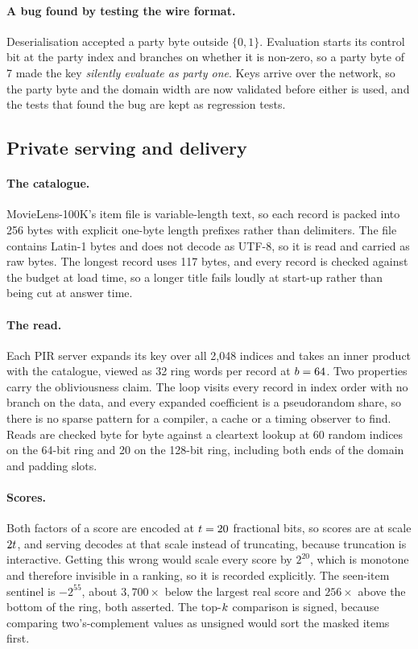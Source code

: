 \paragraph{A bug found by testing the wire format.} Deserialisation accepted a
party byte outside $\{0, 1\}$. Evaluation starts its control bit at the party
index and branches on whether it is non-zero, so a party byte of 7 made the key
\emph{silently evaluate as party one}. Keys arrive over the network, so the party
byte and the domain width are now validated before either is used, and the tests
that found the bug are kept as regression tests.

\subsection{Private serving and delivery}
\label{sec:impl:serve}

\paragraph{The catalogue.} MovieLens-100K's item file is variable-length text, so
each record is packed into 256 bytes with explicit one-byte length prefixes
rather than delimiters. The file contains Latin-1 bytes and does not decode as
UTF-8, so it is read and carried as raw bytes. The longest record uses 117 bytes,
and every record is checked against the budget at load time, so a longer title
fails loudly at start-up rather than being cut at answer time.

\paragraph{The read.} Each PIR server expands its key over all 2{,}048 indices
and takes an inner product with the catalogue, viewed as 32 ring words per
record at $b = 64$. Two properties carry the obliviousness claim. The loop
visits every record in index order with no branch on the data, and every expanded
coefficient is a pseudorandom share, so there is no sparse pattern for a
compiler, a cache or a timing observer to find. Reads are checked byte for byte
against a cleartext lookup at 60 random indices on the 64-bit ring and 20 on the
128-bit ring, including both ends of the domain and padding slots.

\paragraph{Scores.} Both factors of a score are encoded at $t = 20$
fractional bits, so scores are at scale $2t$, and serving decodes at that
scale instead of truncating, because truncation is interactive. Getting this
wrong would scale every score by $2^{20}$, which is monotone and therefore
invisible in a ranking, so it is recorded explicitly. The seen-item sentinel is
$-2^{55}$, about $3{,}700\times$ below the largest real score and $256\times$
above the bottom of the ring, both asserted. The top-$k$ comparison is signed,
because comparing two's-complement values as unsigned would sort the masked items
first.

